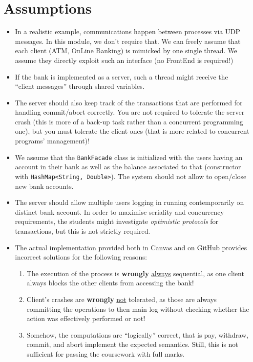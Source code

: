 \documentclass{article}
\begin{document}
	
	\section*{Assumptions}
	\begin{itemize}
		\item In a realistic example, communications happen between processes via UDP messages. In this module, we don't require that. We can freely assume that each client (ATM, OnLine Banking) is mimicked by one single
		thread. We assume they directly exploit such an interface (no
		FrontEnd is required!)
		\item  If the bank is implemented as a server, such a thread might receive the ``client messages'' through shared
		variables. 
		\item The server should also keep track of the transactions
		that are performed for handling commit/abort correctly. You are not required to tolerate the server crash (this is more of
		a back-up task rather than a concurrent programming one), but
		you must tolerate the client ones (that is more related to
		concurrent programs’ management)!
		\item We assume that the \texttt{BankFacade} class is initialized with the users having an account in their bank as well as the balance associated to that (constructor with \texttt{HashMap<String, Double>}). The system should not allow to open/close new bank accounts.
		\item The server should allow multiple users logging in running contemporarily on distinct bank account. In order to maximise seriality and concurrency requirements, the students might investigate \textit{optimistic protocols} for transactions, but this is not strictly required.
		\item The actual implementation provided both in Canvas and on GitHub provides incorrect solutions for the following reasons:
		\begin{enumerate}
		\item The execution of the process is \textbf{wrongly} \underline{always} sequential, as
		one client always blocks the other clients from
		accessing the bank!
		\item Client's crashes are \textbf{wrongly} \underline{not} tolerated, as those are always committing the operations to then
		main log without checking whether the action was
		effectively performed or not!
		\item Somehow, the computations are ``logically'' correct, that is \textsf{pay}, \textsf{withdraw}, \textsf{commit}, and \textsf{abort} implement the expected semantics. Still, this is not sufficient for passing the coursework with full marks. 
		\end{enumerate}
	\end{itemize}
	
\end{document}
